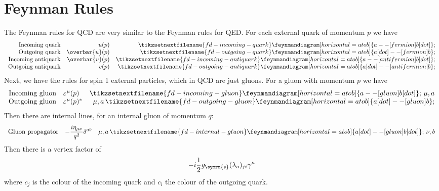 \documentclass[fleqn]{NotesClass}
\newcommand{\strongCoupling}{g_{\symrm{s}}}
\newcommand{\diracadjoint}[1]{\overbar{#1}}
\newcommand{\minkowskiMetric}{\eta}
\begin{document}
    \section{Feynman Rules}
    The Feynman rules for QCD are very similar to the Feynman rules for QED.
    For each external quark of momentum \(p\) we have
    \begin{equation}
        \begin{array}{rrr}
            \text{Incoming quark} & u(p) & \tikzsetnextfilename{fd-incoming-quark}\feynmandiagram[horizontal=a to b]{a -- [fermion] b [dot]}; \\
            \text{Outgoing quark} & \diracadjoint{u}(p) & \tikzsetnextfilename{fd-outgoing-quark}\feynmandiagram[horizontal=a to b]{a [dot] -- [fermion] b}; \\
            \text{Incoming antiquark} & \diracadjoint{v}(p) & \tikzsetnextfilename{fd-incoming-antiquark}\feynmandiagram[horizontal=a to b]{a -- [anti fermion] b [dot]}; \\
            \text{Outgoing antiquark} & v(p) & \tikzsetnextfilename{fd-outgoing-antiquark}\feynmandiagram[horizontal=a to b]{a [dot] -- [anti fermion] b};
        \end{array}
    \end{equation}
    Next, we have the rules for spin 1 external particles, which in QCD are just gluons.
    For a gluon with momentum \(p\) we have
    \begin{equation}
        \begin{array}{rlr}
            \text{Incoming gluon} & \varepsilon^\mu(p) & \tikzsetnextfilename{fd-incoming-gluon}\feynmandiagram[horizontal=a to b]{a -- [gluon] b [dot]}; \, \mu, a \\
            \text{Outgoing gluon} & \varepsilon^\mu(p)^* & \mu, a \, \tikzsetnextfilename{fd-outgoing-gluon}\feynmandiagram[horizontal=a to b]{a [dot] -- [gluon] b};
        \end{array}
    \end{equation}
    Then there are internal lines, for an internal gluon of momentum \(q\):
    \begin{equation}
        \begin{array}{rrr}
            \text{Gluon propagator} & \displaystyle-\frac{i\minkowskiMetric_{\mu\nu}}{q^2}\delta^{ab} & \mu, a \, \tikzsetnextfilename{fd-internal-gluon}\feynmandiagram[horizontal=a to b]{a [dot] -- [gluon] b [dot]}; \, \nu, b
        \end{array}
    \end{equation}
    Then there is a vertex factor of
    \begin{equation}
        -i\frac{1}{2}\strongCoupling (\lambda_a)_{ji}\gamma^\mu
    \end{equation}
    where \(c_j\) is the colour of the incoming quark and \(c_i\) the colour of the outgoing quark.
    
\end{document}
